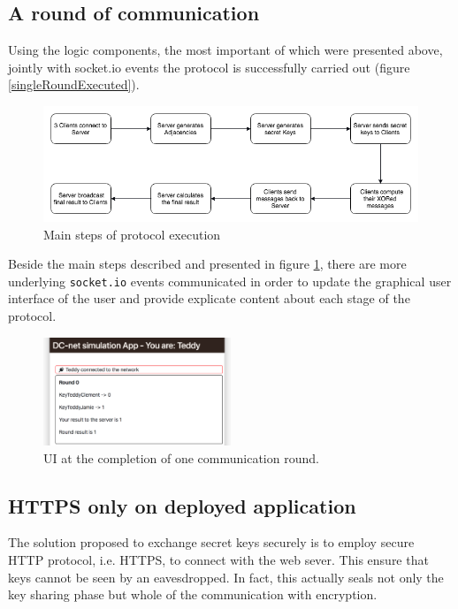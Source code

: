 \subsection{A round of communication}
Using the logic components, the most important of which were presented above, jointly with socket.io events the protocol is successfully carried out (figure \ref{singleRoundExecuted}).

\begin{figure}[H]
    \centering
    \includegraphics[width=1\textwidth]{Images/Implementation/protocolExecuted.png}
    \caption{Main steps of protocol execution}
    \label{fig:protocolExecuted}
\end{figure}

Beside the main steps described and presented in figure \ref{fig:protocolExecuted}, there are more underlying \lstinline{socket.io} events communicated in order to update the graphical user interface of the user and provide explicate content about each stage of the protocol.

\begin{figure}[H]
    \centering
    \includegraphics[width=0.5\textwidth]{Images/Implementation/singleRoundExecuted.png}
    \caption{UI at the completion of one communication round.}
    \label{fig:singleRoundExecuted}
\end{figure}


\subsection{HTTPS only on deployed application}
The solution proposed to exchange secret keys securely is to employ secure HTTP protocol, i.e. HTTPS, to connect with the web sever. This ensure that keys cannot be seen by an eavesdropped. In fact, this actually seals not only the key sharing phase but whole of the communication with encryption.

